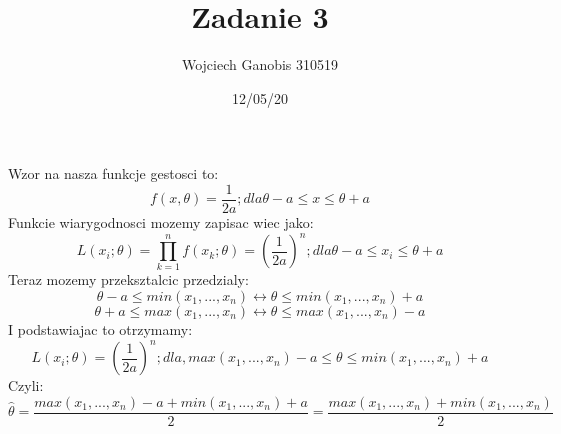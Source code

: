 \documentclass[12pt]{article}
\title{Zadanie 3}
\author{Wojciech Ganobis 310519}
\date{12/05/20}
\begin{document}
\maketitle

Wzor na nasza funkcje gestosci to:
$$f(x,\theta) = \frac{1}{2a}  ;dla \theta - a \leq x \leq \theta + a$$
Funkcie wiarygodnosci mozemy zapisac wiec jako:
$$L(x_{i};\theta) = \prod_{k=1}^{n}f(x_{k};\theta) = (\frac{1}{2a})^{n};dla \theta - a \leq x_{i} \leq \theta + a$$
Teraz mozemy przeksztalcic przedzialy:
$$\theta - a \leq min(x_{1}, ..., x_{n}) \leftrightarrow \theta  \leq min(x_{1}, ..., x_{n}) + a$$
$$\theta + a \leq max(x_{1}, ..., x_{n}) \leftrightarrow \theta  \leq max(x_{1}, ..., x_{n}) - a$$
I podstawiajac to otrzymamy:
$$L(x_{i};\theta)  = (\frac{1}{2a})^{n};dla,  max(x_{1}, ..., x_{n}) - a \leq \theta \leq  min(x_{1}, ..., x_{n}) + a$$
Czyli:
$$\hat{\theta} = \frac{ max(x_{1}, ..., x_{n}) - a +  min(x_{1}, ..., x_{n}) + a}{2} = \frac{ max(x_{1}, ..., x_{n}) +  min(x_{1}, ..., x_{n})}{2}$$
\end{document}
